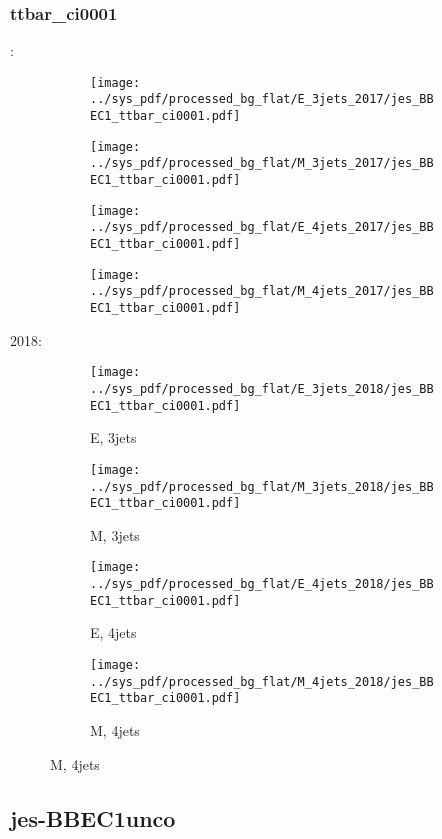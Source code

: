 \documentclass{beamer}
\begin{document}
\begin{frame}
\frametitle{ttbar_ci0001}
\fontsize{5}{1}:
\begin{figure}
\centering
\begin{subfigure}[b]{0.24\textwidth}
\texttt{[image: ../sys\_pdf/processed\_bg\_flat/E\_3jets\_2017/jes\_BBEC1\_ttbar\_ci0001.pdf]}
\end{subfigure}
\begin{subfigure}[b]{0.24\textwidth}
\texttt{[image: ../sys\_pdf/processed\_bg\_flat/M\_3jets\_2017/jes\_BBEC1\_ttbar\_ci0001.pdf]}
\end{subfigure}
\begin{subfigure}[b]{0.24\textwidth}
\texttt{[image: ../sys\_pdf/processed\_bg\_flat/E\_4jets\_2017/jes\_BBEC1\_ttbar\_ci0001.pdf]}
\end{subfigure}
\begin{subfigure}[b]{0.24\textwidth}
\texttt{[image: ../sys\_pdf/processed\_bg\_flat/M\_4jets\_2017/jes\_BBEC1\_ttbar\_ci0001.pdf]}
\end{subfigure}
\end{figure}
2018:
\begin{figure}
\centering
\begin{subfigure}[b]{0.24\textwidth}
\texttt{[image: ../sys\_pdf/processed\_bg\_flat/E\_3jets\_2018/jes\_BBEC1\_ttbar\_ci0001.pdf]}
\captionsetup{font=tiny}
\caption{E, 3jets}
\end{subfigure}
\begin{subfigure}[b]{0.24\textwidth}
\texttt{[image: ../sys\_pdf/processed\_bg\_flat/M\_3jets\_2018/jes\_BBEC1\_ttbar\_ci0001.pdf]}
\captionsetup{font=tiny}
\caption{M, 3jets}
\end{subfigure}
\begin{subfigure}[b]{0.24\textwidth}
\texttt{[image: ../sys\_pdf/processed\_bg\_flat/E\_4jets\_2018/jes\_BBEC1\_ttbar\_ci0001.pdf]}
\captionsetup{font=tiny}
\caption{E, 4jets}
\end{subfigure}
\begin{subfigure}[b]{0.24\textwidth}
\texttt{[image: ../sys\_pdf/processed\_bg\_flat/M\_4jets\_2018/jes\_BBEC1\_ttbar\_ci0001.pdf]}
\captionsetup{font=tiny}
\caption{M, 4jets}
\end{subfigure}
\end{figure}
\end{frame}


\subsection{jes-BBEC1unco}
\end{document}
